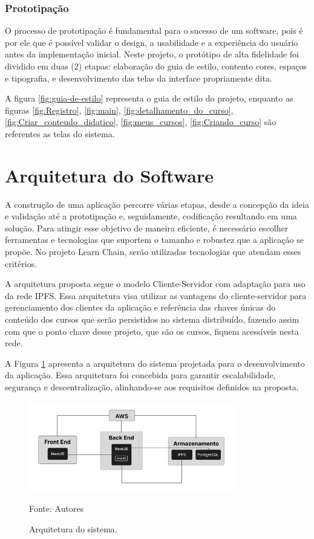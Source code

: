         \subsubsection{Prototipação}

        O processo de prototipação é fundamental para o sucesso de um software, pois é por ele que é possível validar o design, a usabilidade e a experiência do usuário antes da implementação inicial. Neste projeto, o protótipo de alta fidelidade foi dividido em duas (2) etapas: elaboração do guia de estilo, contento cores, espaços e tipografia, e desenvolvimento das telas da interface propriamente dita. 

        A figura \ref{fig:guia-de-estilo} representa o guia de estilo do projeto, enquanto as figuras \ref{fig:Registro}, \ref{fig:main}, \ref{fig:detalhamento_do_curso}, \ref{fig:Criar_conteudo_didatico}, \ref{fig:meus_cursos}, \ref{fig:Criando_curso} são referentes as telas do sistema.

\section{Arquitetura do Software}
A construção de uma aplicação percorre várias etapas, desde a concepção da ideia e validação até a prototipação e, seguidamente, codificação resultando em uma solução. Para atingir esse objetivo de maneira eficiente, é necessário escolher ferramentas e tecnologias que suportem  o tamanho e robustez que a aplicação se propõe. No projeto Learn Chain, serão utilizadas tecnologias que atendam esses critérios.

A arquitetura proposta segue o modelo Cliente-Servidor com adaptação para uso da rede IPFS. Essa arquitetura visa utilizar as vantagens do cliente-servidor para gerenciamento dos clientes da aplicação e referência das chaves únicas do conteúdo dos cursos que serão persistidos no sistema distribuído, fazendo assim com que o ponto chave desse projeto, que são os cursos, fiquem acessíveis nesta rede.

A Figura \ref{fig:arquitetura_sistema} apresenta a arquitetura do sistema projetada para o desenvolvimento da aplicação. Essa arquitetura foi concebida para garantir escalabilidade, segurança e descentralização, alinhando-se aos requisitos definidos na proposta.

\begin{figure}[h]
    \centering
    \caption{Arquitetura do sistema.}
    \includegraphics[width=0.8\textwidth]{figuras/arquitetura.png}
    \begin{center}
        {\footnotesize Fonte: Autores}
    \end{center}
    \label{fig:arquitetura_sistema}
\end{figure}

